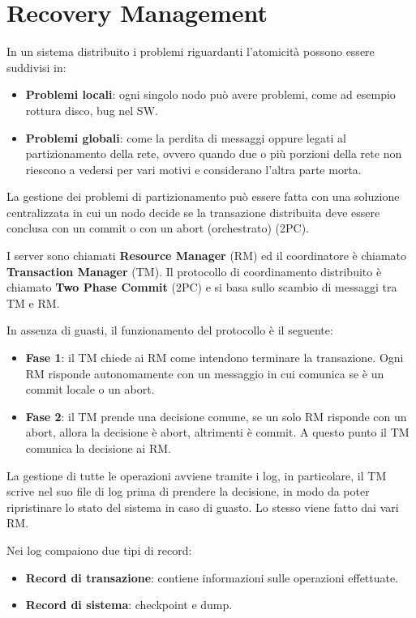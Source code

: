 
\section{Recovery Management}
In un sistema distribuito i problemi riguardanti l'atomicità possono essere
suddivisi in:
\begin{itemize}
    \item \textbf{Problemi locali}: ogni singolo nodo può avere problemi, come ad
          esempio rottura disco, bug nel SW.
    \item \textbf{Problemi globali}: come la perdita di messaggi oppure legati al
          partizionamento della rete, ovvero quando due o più porzioni della
          rete non riescono a vedersi per vari motivi e considerano l'altra
          parte morta.
\end{itemize}
La gestione dei problemi di partizionamento può essere fatta con una soluzione
centralizzata in cui un nodo decide se la transazione distribuita deve essere
conclusa con un commit o con un abort (orchestrato) (2PC).

I server sono chiamati \textbf{Resource Manager} (RM) ed il coordinatore è
chiamato \textbf{Transaction Manager} (TM). Il protocollo di coordinamento
distribuito è chiamato \textbf{Two Phase Commit} (2PC) e si basa sullo scambio
di messaggi tra TM e RM.

In assenza di guasti, il funzionamento del protocollo è il seguente:
\begin{itemize}
    \item \textbf{Fase 1}: il TM chiede ai RM come intendono terminare la
          transazione. Ogni RM risponde autonomamente con un messaggio in cui
          comunica se è un commit locale o un abort.
    \item \textbf{Fase 2}: il TM prende una decisione comune, se un solo RM
          risponde con un abort, allora la decisione è abort, altrimenti è
          commit. A questo punto il TM comunica la decisione ai RM.
\end{itemize}
La gestione di tutte le operazioni avviene tramite i log, in particolare, il TM
scrive nel suo file di log prima di prendere la decisione,
in modo da poter ripristinare lo stato del sistema in caso di guasto. Lo stesso
viene fatto dai vari RM.


Nei log compaiono due tipi di record:
\begin{itemize}
    \item \textbf{Record di transazione}: contiene informazioni sulle operazioni
          effettuate.
    \item \textbf{Record di sistema}: checkpoint e dump.
\end{itemize}


